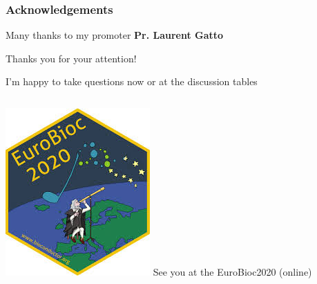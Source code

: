 \documentclass{beamer}
\begin{document}
\begin{frame}[b]
  \frametitle{Acknowledgements}
  \centering
  
  Many thanks to my promoter \textbf{Pr. Laurent Gatto}
  
  \vfill
  Thanks you for your attention!

  {\footnotesize I'm happy to take questions now or at the discussion 
  tables}
  
  \vfill
  \begin{columns}
    \includegraphics[width=\linewidth]{figs/eurobioc2020.jpg}
    See you at the EuroBioc2020 (online) 
  \end{columns}
  

\end{frame}
\end{document}
